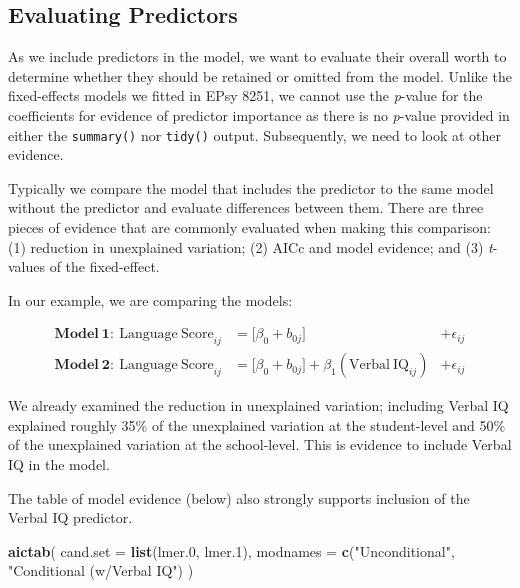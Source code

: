 \documentclass[]{book}
\newenvironment{Shaded}{\begin{snugshade}}{\end{snugshade}}
\newcommand{\DataTypeTok}[1]{\textcolor[rgb]{0.13,0.29,0.53}{#1}}
\newcommand{\FloatTok}[1]{\textcolor[rgb]{0.00,0.00,0.81}{#1}}
\newcommand{\KeywordTok}[1]{\textcolor[rgb]{0.13,0.29,0.53}{\textbf{#1}}}
\newcommand{\NormalTok}[1]{#1}
\newcommand{\StringTok}[1]{\textcolor[rgb]{0.31,0.60,0.02}{#1}}
\begin{document}
\hypertarget{evaluating-predictors}{%
\subsection{Evaluating Predictors}\label{evaluating-predictors}}

As we include predictors in the model, we want to evaluate their overall worth to determine whether they should be retained or omitted from the model. Unlike the fixed-effects models we fitted in EPsy 8251, we cannot use the \emph{p}-value for the coefficients for evidence of predictor importance as there is no \emph{p}-value provided in either the \texttt{summary()} nor \texttt{tidy()} output. Subsequently, we need to look at other evidence.

Typically we compare the model that includes the predictor to the same model without the predictor and evaluate differences between them. There are three pieces of evidence that are commonly evaluated when making this comparison: (1) reduction in unexplained variation; (2) AICc and model evidence; and (3) \emph{t}-values of the fixed-effect.

In our example, we are comparing the models:

\[
\begin{split}
\mathbf{Model~1:~}\mathrm{Language~Score}_{ij} &= \big[\beta_0 + b_{0j}\big] &+ \epsilon_{ij} \\
\mathbf{Model~2:~}\mathrm{Language~Score}_{ij} &= \big[\beta_0 + b_{0j}\big] + \beta_1(\mathrm{Verbal~IQ}_{ij}) &+ \epsilon_{ij}
\end{split}
\]

We already examined the reduction in unexplained variation; including Verbal IQ explained roughly 35\% of the unexplained variation at the student-level and 50\% of the unexplained variation at the school-level. This is evidence to include Verbal IQ in the model.

The table of model evidence (below) also strongly supports inclusion of the Verbal IQ predictor.

\begin{Shaded}
\begin{Highlighting}[]
\KeywordTok{aictab}\NormalTok{(}
  \DataTypeTok{cand.set =} \KeywordTok{list}\NormalTok{(lmer}\FloatTok{.0}\NormalTok{, lmer}\FloatTok{.1}\NormalTok{), }
  \DataTypeTok{modnames =} \KeywordTok{c}\NormalTok{(}\StringTok{"Unconditional"}\NormalTok{, }\StringTok{"Conditional (w/Verbal IQ"}\NormalTok{)}
\NormalTok{)}
\end{Highlighting}
\end{Shaded}
\end{document}
